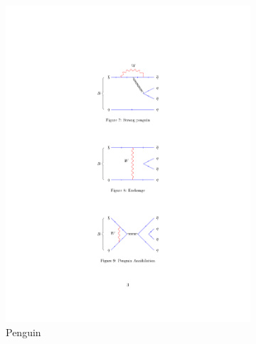 \begin{figure}[!h]
\begin{subfigure}[b]{0.32\textwidth}
        \includegraphics[width=1.0\textwidth]{figs/Theory/Peng.pdf}
        \caption{Penguin}
        \label{fig:theory_penguin}
    \end{subfigure}
    \begin{subfigure}[b]{0.32\textwidth}
        \centering

\end{subfigure}
\end{figure}
